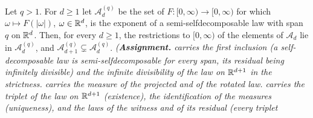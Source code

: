 \begin{proposition}
\label{prop:what-does-not-lift-chain}
\leanok
{}
Let $q > 1$. For $d \ge 1$ let $\mathcal{A}^{(q)}_d$ be the set of $F : [0,\infty) \to [0,\infty)$
for which $\omega \mapsto F(|\omega|)$, $\omega \in \mathbb{R}^d$, is the exponent of a
semi-selfdecomposable law with span $q$ on $\mathbb{R}^d$. Then, for every $d \ge 1$,
the restrictions to $[0,\infty)$ of the elements of $\mathcal{A}_d$ lie in $\mathcal{A}^{(q)}_d$,
and $\mathcal{A}^{(q)}_{d+1} \subsetneq \mathcal{A}^{(q)}_d$.
\statusA\quad{}\quad{}\quad{}\quad\emph{(\textbf{Assignment.} 
carries the first inclusion (a self-decomposable law is semi-selfdecomposable for every span, its
residual being infinitely divisible) and the infinite divisibility of the law on $\mathbb{R}^{d+1}$ in the
strictness.  carries the \Levy{} measure of the projected and of the rotated law.
 carries the triplet of the law on $\mathbb{R}^{d+1}$ (existence), the identification
of the \Levy{} measures (uniqueness), and the laws of the witness and of its residual (every triplet
}
\end{proposition}
